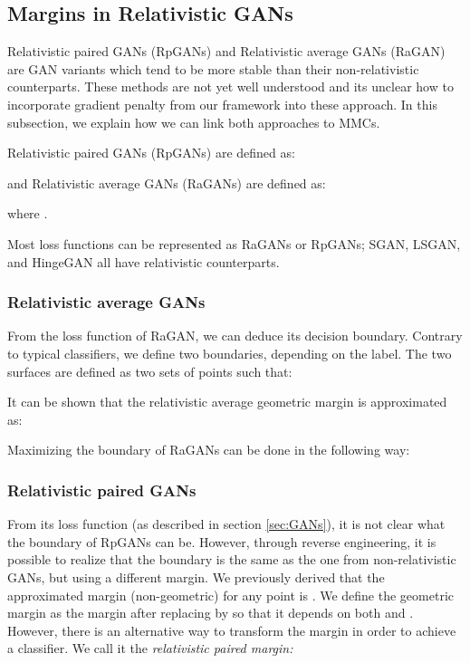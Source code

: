 \documentclass{article}
\begin{document}
\subsection{Margins in Relativistic GANs}
\label{sec:5.5}

Relativistic paired GANs (RpGANs) and Relativistic average GANs (RaGAN) \citep{jolicoeur2018relativistic,jolicoeur2019relativistic} are GAN variants which tend to be more stable than their non-relativistic counterparts. These methods are not yet well understood and its unclear how to incorporate gradient penalty from our framework into these approach. In this subsection, we explain how we can link both approaches to MMCs.

Relativistic paired GANs (RpGANs) are defined as:

and Relativistic average GANs (RaGANs) are defined as:

where .

Most loss functions can be represented as RaGANs or RpGANs; SGAN, LSGAN, and HingeGAN all have relativistic counterparts.



\subsubsection{Relativistic average GANs}

From the loss function of RaGAN, we can deduce its decision boundary.
Contrary to typical classifiers, we define two boundaries, depending on the label.
The two surfaces are defined as two sets of points  such that:

It can be shown that the relativistic average geometric margin is approximated as:


Maximizing the boundary of RaGANs can be done in the following way:


\subsubsection{Relativistic paired GANs}

From its loss function (as described in section \ref{sec:GANs}), it is not clear what the boundary of RpGANs can be. However, through reverse engineering, it is possible to realize that the boundary is the same as the one from non-relativistic GANs, but using a different margin. We previously derived that the approximated margin (non-geometric) for any point is . We define the geometric margin as the margin after replacing  by  so that it depends on both  and . However, there is an alternative way to transform the margin in order to achieve a classifier. We call it the \em relativistic paired margin\em:
\end{document}
